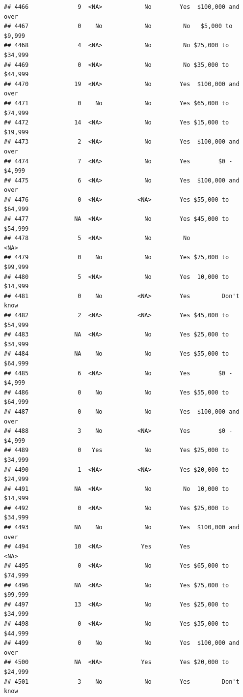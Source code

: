 \documentclass[man]{apa6}
\begin{document}
\begin{verbatim}
## 4466              9  <NA>            No        Yes  $100,000 and over
## 4467              0    No            No         No   $5,000 to $9,999
## 4468              4  <NA>            No         No $25,000 to $34,999
## 4469              0  <NA>            No         No $35,000 to $44,999
## 4470             19  <NA>            No        Yes  $100,000 and over
## 4471              0    No            No        Yes $65,000 to $74,999
## 4472             14  <NA>            No        Yes $15,000 to $19,999
## 4473              2  <NA>            No        Yes  $100,000 and over
## 4474              7  <NA>            No        Yes        $0 - $4,999
## 4475              6  <NA>            No        Yes  $100,000 and over
## 4476              0  <NA>          <NA>        Yes $55,000 to $64,999
## 4477             NA  <NA>            No        Yes $45,000 to $54,999
## 4478              5  <NA>            No         No               <NA>
## 4479              0    No            No        Yes $75,000 to $99,999
## 4480              5  <NA>            No        Yes  10,000 to $14,999
## 4481              0    No          <NA>        Yes         Don't know
## 4482              2  <NA>          <NA>        Yes $45,000 to $54,999
## 4483             NA  <NA>            No        Yes $25,000 to $34,999
## 4484             NA    No            No        Yes $55,000 to $64,999
## 4485              6  <NA>            No        Yes        $0 - $4,999
## 4486              0    No            No        Yes $55,000 to $64,999
## 4487              0    No            No        Yes  $100,000 and over
## 4488              3    No          <NA>        Yes        $0 - $4,999
## 4489              0   Yes            No        Yes $25,000 to $34,999
## 4490              1  <NA>          <NA>        Yes $20,000 to $24,999
## 4491             NA  <NA>            No         No  10,000 to $14,999
## 4492              0  <NA>            No        Yes $25,000 to $34,999
## 4493             NA    No            No        Yes  $100,000 and over
## 4494             10  <NA>           Yes        Yes               <NA>
## 4495              0  <NA>            No        Yes $65,000 to $74,999
## 4496             NA  <NA>            No        Yes $75,000 to $99,999
## 4497             13  <NA>            No        Yes $25,000 to $34,999
## 4498              0  <NA>            No        Yes $35,000 to $44,999
## 4499              0    No            No        Yes  $100,000 and over
## 4500             NA  <NA>           Yes        Yes $20,000 to $24,999
## 4501              3    No            No        Yes         Don't know

\end{verbatim}
\end{document}
